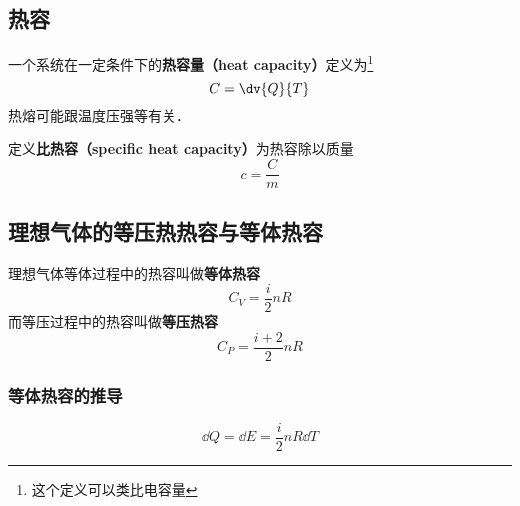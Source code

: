 
\subsection{热容}
一个系统在一定条件下的\textbf{热容量（heat capacity）}定义为\footnote{这个定义可以类比电容量}
\begin{equation}
C = \dv{Q}{T}
\end{equation}
热熔可能跟温度压强等有关．

定义\textbf{比热容（specific heat capacity）}为热容除以质量
\begin{equation}
c = \frac{C}{m}
\end{equation}

\subsection{理想气体的等压热热容与等体热容}
理想气体等体过程中的热容叫做\textbf{等体热容}
\begin{equation}
C_V = \frac{i}{2} n R
\end{equation}
而等压过程中的热容叫做\textbf{等压热容}
\begin{equation}
C_P = \frac{i+2}{2} n R
\end{equation}

\subsubsection{等体热容的推导}
\begin{equation}
\dd{Q} = \dd{E} = \frac{i}{2} nR\dd{T}
\end{equation}

